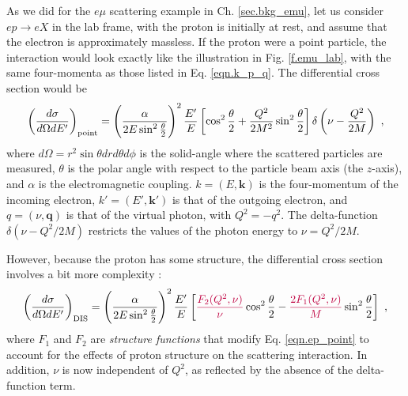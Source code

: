 As we did for the $e\mu$ scattering example in Ch. \ref{sec.bkg_emu}, let us consider $ep\rightarrow eX$ in the lab frame, with the proton is initially at rest, and assume that the electron is approximately massless. If the proton were a point particle, the interaction would look exactly like the illustration in Fig. \ref{f.emu_lab}, with the same four-momenta as those listed in Eq. \eqref{eqn.k_p_q}. 
The differential cross section would be \cite{Halzen_Martin}
\begin{equation}
    \left(\frac{d\sigma}{d\Omega dE'} \right)_{\rm point} = \left( \frac{\alpha}{2E\sin^2\frac{\theta}{2}} \right)^2 \frac{E'}{E} \left[ \cos^2\frac{\theta}{2}+\frac{Q^2}{2M^2}\sin^2\frac{\theta}{2} \right] \delta\left(\nu - \frac{Q^2}{2M} \right) \ ,
    \label{eqn.ep_point}
\end{equation}
where $d\Omega=r^2\sin{\theta}drd\theta d\phi$ is the solid-angle where the scattered particles are measured, $\theta$ is the polar angle with respect to the particle beam axis (the $z$-axis), and $\alpha$ is the electromagnetic coupling. $k=(E,\mathbf{k})$ is the four-momentum of the incoming electron, $k'=(E',\mathbf{k'})$ is that of the outgoing electron, and $q=(\nu,\mathbf{q})$ is that of the virtual photon, with $Q^2=-q^2$. The delta-function $\delta\left(\nu -{Q^2}/{2M} \right)$ restricts the values of the photon energy to $\nu=Q^2/2M$.

However, because the proton has some structure, the differential cross section involves a bit more complexity \cite{Halzen_Martin}:
\begin{equation}
    \left(\frac{d\sigma}{d\Omega dE'} \right)_{\rm DIS} = \left( \frac{\alpha}{2E\sin^2\frac{\theta}{2}} \right)^2 \frac{E'}{E} \left[ {\color{purple}\frac{F_2(Q^2,\nu)}{\nu}}\cos^2\frac{\theta}{2}-{\color{purple}\frac{2F_1(Q^2,\nu)}{M}}\sin^2\frac{\theta}{2} \right] \ ,
    \label{eqn.ep_eX}
\end{equation}
where $F_1$ and $F_2$ are {\it structure functions} that modify Eq. \eqref{eqn.ep_point} to account for the effects of proton structure on the scattering interaction. In addition, $\nu$ is now independent of $Q^2$, as reflected by the absence of the delta-function term.

